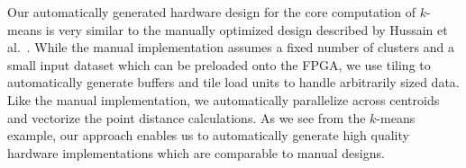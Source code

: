 Our automatically generated hardware design for the core computation of $k$-means is very similar to the manually optimized design described by Hussain et al.~\cite{hwkmeans}.
While the manual implementation assumes a fixed number of clusters and a small input dataset which can be preloaded onto the FPGA, we use tiling to automatically generate
buffers and tile load units to handle arbitrarily sized data. Like the manual implementation, we automatically parallelize across centroids
and vectorize the point distance calculations. As we see from the $k$-means example, our approach enables us to automatically generate high quality hardware implementations which are comparable to manual designs.


